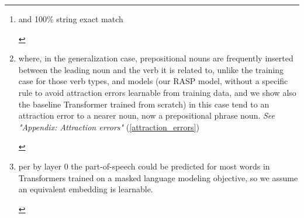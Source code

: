 \documentclass[11pt]{article}
\begin{document}
\begin{abstract}
\cite{Wu2023} variant of COGS systematically and compositionally: Our RASP model attains 100\% semantic exact match\footnote{\begin{footnotesize}and 100\% string exact match\end{footnotesize}} on the ReCOGS test set and 100\% SEM on all generalization splits except obj\_pp\_to\_subj\_pp\footnote{\begin{footnotesize}where, in the generalization case, prepositional nouns are frequently inserted between the leading noun and the verb it is related to, unlike the training case for those verb types, and models (our RASP model, without a specific rule to avoid attraction errors learnable from training data, and we show also the baseline Transformer trained from scratch) in this case tend to an attraction error to a nearer noun, now a prepositional phrase noun. \textit{See "Appendix: Attraction errors"} (\ref{attraction_errors})\end{footnotesize}} which gets 92\%. Furthermore, our RASP model shows the ReCOGS\_pos task does not require a hierarchical or tree-structured solution: we use word-level tokens with an "embedding" layer that tags with possible part of speech\footnote{\begin{footnotesize}per \cite{tenney2019bertrediscoversclassicalnlp} by layer 0 the part-of-speech could be predicted for most words in Transformers trained on a masked language modeling objective, so we assume an equivalent embedding is learnable.\end{footnotesize}}, applying just once per encoder pass 19 attention-head compatible flat pattern-matching rules, shown using grammar coverage \cite{fuzzingbook2023:GrammarCoverageFuzzer} to be learnable from the training data, plus general prepositional phrase (pp) handling and sentential complement (cp) handling logic, and output the next logical form (LF) token (repeating until the LF is complete). The model does not apply recursive, tree-structured rules like `np\_det pp np -> np\_pp -> np`, but scores 100\% semantic and string exact match on pp recursion, cp recursion using the decoder loop.

\end{abstract}
\end{document}

